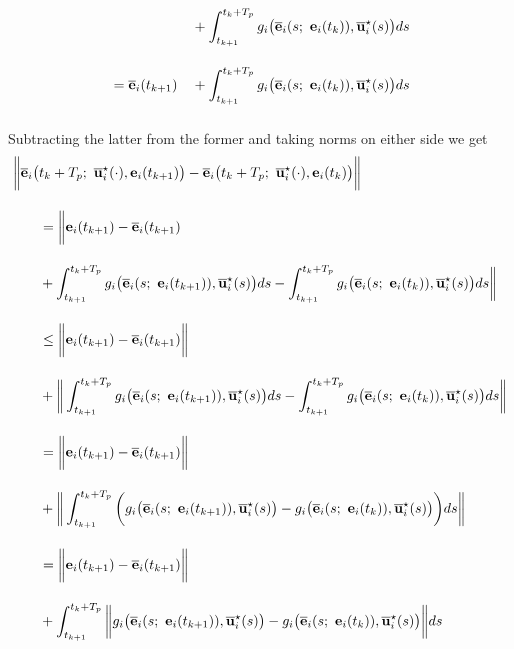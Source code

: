 \begin{gg_box}
\begin{alignat}{2}
    &                      &&+ \int_{t_{k+1}}^{t_k + T_p} g_i\big(\overline{\vect{e}}_i(s;\ \vect{e}_i(t_k)), \overline{\vect{u}}_i^{\star}(s) \big)ds \\[2.5ex]
    &= \overline{\vect{e}}_i(t_{k+1}) &&+ \int_{t_{k+1}}^{t_k + T_p} g_i\big(\overline{\vect{e}}_i(s;\ \vect{e}_i(t_k)), \overline{\vect{u}}_i^{\star}(s) \big)ds \\[2.5ex]
\end{alignat}
Subtracting the latter from the former and taking norms on either side we get
\begin{alignat}{2}
  \bigg \|\overline{\vect{e}}_i\big(&t_k + T_p;\ \overline{\vect{u}}_i^{\star}(\cdot), \vect{e}_i(t_{k+1})\big)
    - \overline{\vect{e}}_i\big(t_k + T_p;\ \overline{\vect{u}}_i^{\star}(\cdot), \vect{e}_i(t_k)\big) \bigg\| \\[2.5ex]
  &= \bigg \| \vect{e}_i(t_{k+1}) - \overline{\vect{e}}_i(t_{k+1}) \\[2.5ex]
  &+ \int_{t_{k+1}}^{t_k + T_p} g_i\big(\overline{\vect{e}}_i(s;\ \vect{e}_i(t_{k+1})), \overline{\vect{u}}_i^{\star}(s) \big)ds
    - \int_{t_{k+1}}^{t_k + T_p} g_i\big(\overline{\vect{e}}_i(s;\ \vect{e}_i(t_k)), \overline{\vect{u}}_i^{\star}(s) \big)ds \bigg \| \\[2.5ex]
  &\leq \bigg \| \vect{e}_i(t_{k+1}) - \overline{\vect{e}}_i(t_{k+1}) \bigg\| \\[2.5ex]
  &+ \bigg \| \int_{t_{k+1}}^{t_k + T_p} g_i\big(\overline{\vect{e}}_i(s;\ \vect{e}_i(t_{k+1})), \overline{\vect{u}}_i^{\star}(s) \big)ds
    - \int_{t_{k+1}}^{t_k + T_p} g_i\big(\overline{\vect{e}}_i(s;\ \vect{e}_i(t_k)), \overline{\vect{u}}_i^{\star}(s) \big)ds \bigg \| \\[2.5ex]
  &= \bigg \| \vect{e}_i(t_{k+1}) - \overline{\vect{e}}_i(t_{k+1}) \bigg\| \\[2.5ex]
  &+ \bigg \| \int_{t_{k+1}}^{t_k + T_p} \bigg( g_i\big(\overline{\vect{e}}_i(s;\ \vect{e}_i(t_{k+1})), \overline{\vect{u}}_i^{\star}(s) \big)
  -  g_i\big(\overline{\vect{e}}_i(s;\ \vect{e}_i(t_k)), \overline{\vect{u}}_i^{\star}(s) \big) \bigg) ds \bigg \| \\[2.5ex]
  &= \bigg \| \vect{e}_i(t_{k+1}) - \overline{\vect{e}}_i(t_{k+1}) \bigg\| \\[2.5ex]
  &+  \int_{t_{k+1}}^{t_k + T_p} \bigg\| g_i\big(\overline{\vect{e}}_i(s;\ \vect{e}_i(t_{k+1})), \overline{\vect{u}}_i^{\star}(s) \big)
  -  g_i\big(\overline{\vect{e}}_i(s;\ \vect{e}_i(t_k)), \overline{\vect{u}}_i^{\star}(s) \big) \bigg\| ds \\[2.5ex]

\end{alignat}
\end{gg_box}
